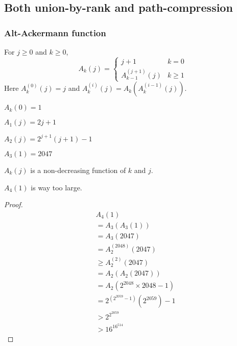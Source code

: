 \subsection{Both union-by-rank and path-compression}

\subsubsection{Alt-Ackermann function}

\begin{definition}
For $j \ge 0$ and $k \ge 0$,
\[ A_k(j) = \begin{cases} j + 1 & k = 0 \\ A_{k-1}^{(j+1)}(j) & k \ge 1 \end{cases} \]
Here $A_k^{(0)}(j) = j$ and $A_k^{(i)}(j) = A_k(A_k^{(i-1)}(j))$.
\end{definition}

\begin{theorem} $A_k(0) = 1$ \end{theorem}
\begin{theorem} $A_1(j) = 2j+1$ \end{theorem}
\begin{theorem} $A_2(j) = 2^{j+1}(j+1) - 1$ \end{theorem}
\begin{theorem} $A_3(1) = 2047$ \end{theorem}
\begin{theorem} $A_k(j)$ is a non-decreasing function of $k$ and $j$. \end{theorem}
\begin{theorem} $A_4(1)$ is way too large. \end{theorem}
\begin{proof}
\begin{align*}
& A_4(1)
\\ &= A_3(A_3(1))
\\ &= A_3(2047)
\\ &= A_2^{(2048)}(2047)
\\ &\ge A_2^{(2)}(2047)
\\ &= A_2(A_2(2047))
\\ &= A_2(2^{2048} \times 2048 - 1)
\\ &= 2^{\left( 2^{2059} - 1 \right)}\left( 2^{2059} \right) - 1
\\ &> 2^{2^{2059}}
\\ &> 16^{16^{514}}
\end{align*}
\end{proof}

